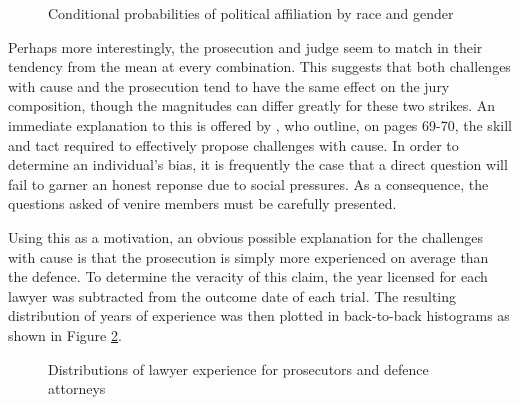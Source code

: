 \begin{figure}[h!]
  \caption[Political Affiliation by Race and Gender (Sunshine)]
  {Conditional probabilities of political affiliation by race and gender} 
  \label{fig:racepolitics}
\end{figure}

Perhaps more interestingly, the prosecution and judge seem to match in their tendency from the mean at every combination. This
suggests that both challenges with cause and the prosecution tend to have the same effect on the jury composition, though the
magnitudes can differ greatly for these two strikes. An immediate explanation to this is offered by \cite{hansvidjudging}, who
outline, on pages 69-70, the skill and tact required to effectively propose challenges with cause. In order to determine an
individual's bias, it is frequently the case that a direct question will fail to garner an honest reponse due to social pressures.
As a consequence, the questions asked of venire members must be carefully presented.

Using this as a motivation, an obvious possible explanation for the challenges with cause is that the prosecution is simply more
experienced on average than the defence. To determine the veracity of this claim, the year licensed for each lawyer was
subtracted from the outcome date of each trial. The resulting distribution of years of experience was then plotted in back-to-back
histograms as shown in Figure \ref{fig:lawyerexp}.

\begin{figure}[h!]
  \caption[Lawyer Experience (Sunshine)]
  {Distributions of lawyer experience for prosecutors and defence attorneys}
  \label{fig:lawyerexp}
\end{figure}

